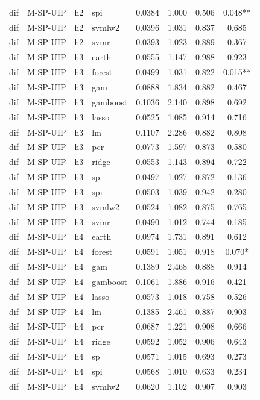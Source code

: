 \begin{ThreePartTable}
\begin{longtable}[t]{llclcccc}
dif & M-SP-UIP & h2 & spi & 0.0384 & 1.000 & 0.506 & 0.048**\\
dif & M-SP-UIP & h2 & svmlw2 & 0.0396 & 1.031 & 0.837 & 0.685\\
dif & M-SP-UIP & h2 & svmr & 0.0393 & 1.023 & 0.889 & 0.367\\
\addlinespace
dif & M-SP-UIP & h3 & earth & 0.0555 & 1.147 & 0.988 & 0.923\\
dif & M-SP-UIP & h3 & forest & 0.0499 & 1.031 & 0.822 & 0.015**\\
dif & M-SP-UIP & h3 & gam & 0.0888 & 1.834 & 0.882 & 0.467\\
dif & M-SP-UIP & h3 & gamboost & 0.1036 & 2.140 & 0.898 & 0.692\\
dif & M-SP-UIP & h3 & lasso & 0.0525 & 1.085 & 0.914 & 0.716\\
dif & M-SP-UIP & h3 & lm & 0.1107 & 2.286 & 0.882 & 0.808\\
dif & M-SP-UIP & h3 & pcr & 0.0773 & 1.597 & 0.873 & 0.580\\
dif & M-SP-UIP & h3 & ridge & 0.0553 & 1.143 & 0.894 & 0.722\\
dif & M-SP-UIP & h3 & sp & 0.0497 & 1.027 & 0.872 & 0.136\\
dif & M-SP-UIP & h3 & spi & 0.0503 & 1.039 & 0.942 & 0.280\\
dif & M-SP-UIP & h3 & svmlw2 & 0.0524 & 1.082 & 0.875 & 0.765\\
dif & M-SP-UIP & h3 & svmr & 0.0490 & 1.012 & 0.744 & 0.185\\
\addlinespace
dif & M-SP-UIP & h4 & earth & 0.0974 & 1.731 & 0.891 & 0.612\\
dif & M-SP-UIP & h4 & forest & 0.0591 & 1.051 & 0.918 & 0.070*\\
dif & M-SP-UIP & h4 & gam & 0.1389 & 2.468 & 0.888 & 0.914\\
dif & M-SP-UIP & h4 & gamboost & 0.1061 & 1.886 & 0.916 & 0.421\\
dif & M-SP-UIP & h4 & lasso & 0.0573 & 1.018 & 0.758 & 0.526\\
dif & M-SP-UIP & h4 & lm & 0.1385 & 2.461 & 0.887 & 0.903\\
dif & M-SP-UIP & h4 & pcr & 0.0687 & 1.221 & 0.908 & 0.666\\
dif & M-SP-UIP & h4 & ridge & 0.0592 & 1.052 & 0.906 & 0.643\\
dif & M-SP-UIP & h4 & sp & 0.0571 & 1.015 & 0.693 & 0.273\\
dif & M-SP-UIP & h4 & spi & 0.0568 & 1.010 & 0.633 & 0.234\\
dif & M-SP-UIP & h4 & svmlw2 & 0.0620 & 1.102 & 0.907 & 0.903\\

\end{longtable}
\end{ThreePartTable}
